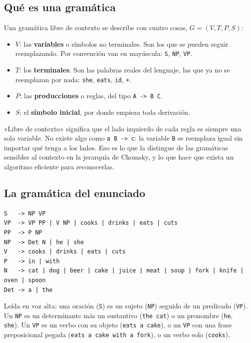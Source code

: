 \documentclass[11pt,a4paper]{article}
\newcommand{\gram}[1]{\texttt{#1}}
\begin{document}
\subsection{Qué es una gramática}

Una gramática libre de contexto se describe con cuatro cosas,
$G = (V, T, P, S)$:

\begin{itemize}[leftmargin=*]
  \item $V$: las \textbf{variables} o símbolos no terminales. Son los que se
  pueden seguir reemplazando. Por convención van en mayúscula: \gram{S},
  \gram{NP}, \gram{VP}.
  \item $T$: los \textbf{terminales}. Son las palabras reales del lenguaje,
  las que ya no se reemplazan por nada: \gram{she}, \gram{eats}, \gram{id},
  \gram{+}.
  \item $P$: las \textbf{producciones} o reglas, del tipo \gram{A -> B C}.
  \item $S$: el \textbf{símbolo inicial}, por donde empieza toda derivación.
\end{itemize}

«Libre de contexto» significa que el lado izquierdo de cada regla es siempre
una sola variable. No existe algo como \gram{a B -> c}: la variable \gram{B}
se reemplaza igual sin importar qué tenga a los lados. Eso es lo que la
distingue de las gramáticas sensibles al contexto en la jerarquía de Chomsky,
y lo que hace que exista un algoritmo eficiente para reconocerlas.

\subsection{La gramática del enunciado}

\begin{lstlisting}
S   -> NP VP
VP  -> VP PP | V NP | cooks | drinks | eats | cuts
PP  -> P NP
NP  -> Det N | he | she
V   -> cooks | drinks | eats | cuts
P   -> in | with
N   -> cat | dog | beer | cake | juice | meat | soup | fork | knife | oven | spoon
Det -> a | the
\end{lstlisting}

Leída en voz alta: una oración (\gram{S}) es un sujeto (\gram{NP}) seguido de
un predicado (\gram{VP}). Un \gram{NP} es un determinante más un sustantivo
(\gram{the cat}) o un pronombre (\gram{he}, \gram{she}). Un \gram{VP} es un
verbo con su objeto (\gram{eats a cake}), o un \gram{VP} con una frase
preposicional pegada (\gram{eats a cake with a fork}), o un verbo solo
(\gram{cooks}).
\end{document}
